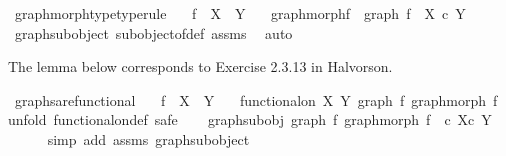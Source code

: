 \begin{isabellebody}
\isanewline
%
\endisadelimproof
\isanewline
{}\isamarkupfalse%
\ graph{\isacharunderscore}{\kern0pt}morph{\isacharunderscore}{\kern0pt}type{\isacharbrackleft}{\kern0pt}type{\isacharunderscore}{\kern0pt}rule{\isacharbrackright}{\kern0pt}{\isacharcolon}{\kern0pt}\isanewline
\ \ \ {\isachardoublequoteopen}f\ {\isacharcolon}{\kern0pt}\ X\ {\isasymrightarrow}\ Y{\isachardoublequoteclose}\isanewline
\ \ \ {\isachardoublequoteopen}graph{\isacharunderscore}{\kern0pt}morph{\isacharparenleft}{\kern0pt}f{\isacharparenright}{\kern0pt}\ {\isacharcolon}{\kern0pt}\ graph\ f\ {\isasymrightarrow}\ X\ {\isasymtimes}\isactrlsub c\ Y{\isachardoublequoteclose}\isanewline
%
\isadelimproof
\ \ %
\endisadelimproof
%
\isatagproof
{}\isamarkupfalse%
\ graph{\isacharunderscore}{\kern0pt}subobject\ subobject{\isacharunderscore}{\kern0pt}of{\isacharunderscore}{\kern0pt}def{}\ assms\ \isamarkupfalse%
\ auto%
\endisatagproof
{\isafoldproof}%
%
\isadelimproof
%
\endisadelimproof
%
\begin{isamarkuptext}%
The lemma below corresponds to Exercise 2.3.13 in Halvorson.%
\end{isamarkuptext}\isamarkuptrue%
\isamarkupfalse%
\ graphs{\isacharunderscore}{\kern0pt}are{\isacharunderscore}{\kern0pt}functional{\isacharcolon}{\kern0pt}\isanewline
\ \ \ {\isachardoublequoteopen}f\ {\isacharcolon}{\kern0pt}\ X\ {\isasymrightarrow}\ Y{\isachardoublequoteclose}\isanewline
\ \ \ {\isachardoublequoteopen}functional{\isacharunderscore}{\kern0pt}on\ X\ Y\ {\isacharparenleft}{\kern0pt}graph\ f{\isacharcomma}{\kern0pt}\ graph{\isacharunderscore}{\kern0pt}morph\ f{\isacharparenright}{\kern0pt}{\isachardoublequoteclose}\isanewline
%
\isadelimproof
%
\endisadelimproof
%
\isatagproof
{}\isamarkupfalse%
{\isacharparenleft}{\kern0pt}unfold\ functional{\isacharunderscore}{\kern0pt}on{\isacharunderscore}{\kern0pt}def{\isacharcomma}{\kern0pt}\ safe{\isacharparenright}{\kern0pt}\isanewline
\ \ \isamarkupfalse%
\ graph{\isacharunderscore}{\kern0pt}subobj{\isacharcolon}{\kern0pt}\ {\isachardoublequoteopen}{\isacharparenleft}{\kern0pt}graph\ f{\isacharcomma}{\kern0pt}\ graph{\isacharunderscore}{\kern0pt}morph\ f{\isacharparenright}{\kern0pt}\ \ {\isasymsubseteq}\isactrlsub c\ {\isacharparenleft}{\kern0pt}X{\isasymtimes}\isactrlsub c\ Y{\isacharparenright}{\kern0pt}{\isachardoublequoteclose}\isanewline
\ \ \ \ \isamarkupfalse%
\ {\isacharparenleft}{\kern0pt}simp\ add{\isacharcolon}{\kern0pt}\ assms\ graph{\isacharunderscore}{\kern0pt}subobject{\isacharparenright}{\kern0pt}\isanewline

\end{isabellebody}
